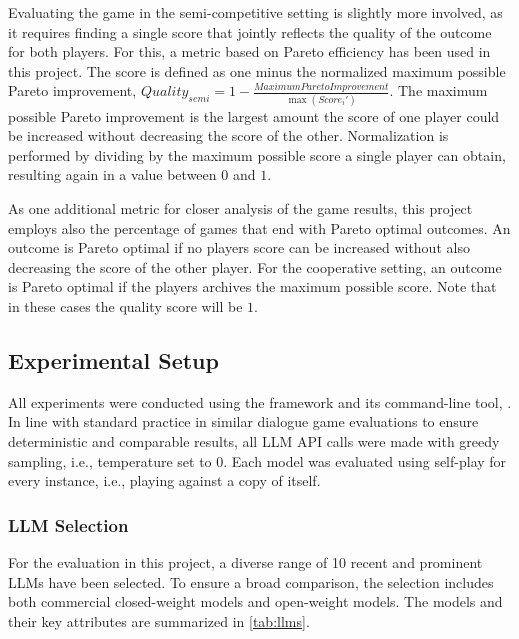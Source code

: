 Evaluating the game in the semi-competitive setting is slightly more involved, as it requires finding a single score that jointly reflects the quality of the outcome for both players. For this, a metric based on Pareto efficiency has been used in this project. The score is defined as one minus the normalized maximum possible Pareto improvement, $\mathit{Quality}_\mathit{semi} = 1 - \frac{\mathit{Maximum Pareto Improvement}}{\max ( \mathit{Score}_i' )}$. The maximum possible Pareto improvement is the largest amount the score of one player could be increased without decreasing the score of the other. Normalization is performed by dividing by the maximum possible score a single player can obtain, resulting again in a value between $0$ and $1$.

As one additional metric for closer analysis of the game results, this project employs also the percentage of games that end with Pareto optimal outcomes. An outcome is Pareto optimal if no players score can be increased without also decreasing the score of the other player. For the cooperative setting, an outcome is Pareto optimal if the players archives the maximum possible score. Note that in these cases the quality score will be $1$. 


\subsection{Experimental Setup}

All experiments were conducted using the  framework and its command-line tool, . In line with standard practice in similar dialogue game evaluations \cite{chalamalasetti-etal-2023-clembench,srivastava2022beyond} to ensure deterministic and comparable results, all LLM API calls were made with greedy sampling, i.e., temperature set to 0. Each model was evaluated using self-play for every instance, i.e., playing against a copy of itself.


\subsubsection{LLM Selection}

For the evaluation in this project, a diverse range of 10 recent and prominent LLMs have been selected. To ensure a broad comparison, the selection includes both commercial closed-weight models and open-weight models. The models and their key attributes are summarized in \cref{tab:llms}.

